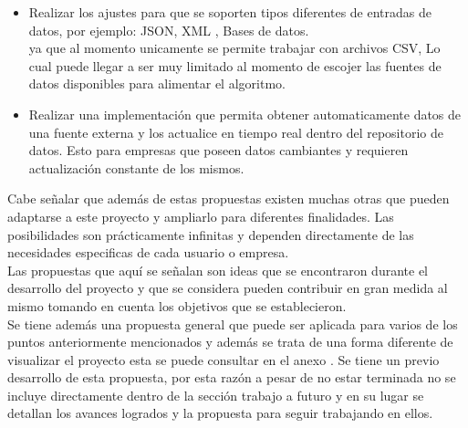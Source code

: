 \begin{itemize}
	\item Realizar los ajustes para que se soporten tipos diferentes de entradas de datos, por ejemplo: JSON, XML , Bases de datos. \\
	ya que al momento unicamente se permite trabajar con archivos CSV, Lo cual puede llegar a ser muy limitado al momento de escojer las fuentes de datos disponibles para alimentar el algoritmo.\\
	\item Realizar una implementación que permita obtener automaticamente datos de una fuente externa y los actualice en tiempo real dentro del repositorio de datos. Esto para empresas que poseen datos cambiantes y requieren actualización constante de los mismos.    
\end{itemize}   
Cabe señalar que además de estas propuestas existen muchas otras que pueden adaptarse a este proyecto y ampliarlo para diferentes finalidades. Las posibilidades son prácticamente infinitas y dependen directamente de las necesidades especificas de cada usuario o empresa. 
\\
Las propuestas que aquí se señalan son ideas que se encontraron durante el desarrollo del proyecto y que se considera pueden contribuir en gran medida al mismo tomando en cuenta los objetivos que se establecieron.\\

Se tiene además una propuesta general que puede ser aplicada para varios de los puntos anteriormente mencionados y además se trata de una forma diferente de visualizar el proyecto esta se puede consultar en el anexo . Se tiene un previo desarrollo de esta propuesta, por esta razón a pesar de no estar terminada no se incluye directamente dentro de la sección trabajo a futuro y en su lugar se detallan los avances logrados y la propuesta para seguir trabajando en ellos.\\








